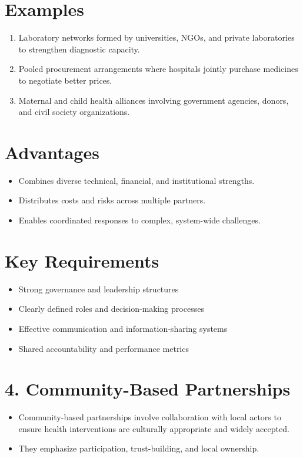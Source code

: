 \documentclass[10pt]{article}
\begin{document}
\section*{Examples}
\begin{enumerate}
  \item Laboratory networks formed by universities, NGOs, and private laboratories to strengthen diagnostic capacity.
  \item Pooled procurement arrangements where hospitals jointly purchase medicines to negotiate better prices.
  \item Maternal and child health alliances involving government agencies, donors, and civil society organizations.
\end{enumerate}

\section*{Advantages}
\begin{itemize}
  \item Combines diverse technical, financial, and institutional strengths.
  \item Distributes costs and risks across multiple partners.
  \item Enables coordinated responses to complex, system-wide challenges.
\end{itemize}

\section*{Key Requirements}
\begin{itemize}
  \item Strong governance and leadership structures
  \item Clearly defined roles and decision-making processes
  \item Effective communication and information-sharing systems
  \item Shared accountability and performance metrics
\end{itemize}

\section*{4. Community-Based Partnerships}
\begin{itemize}
  \item Community-based partnerships involve collaboration with local actors to ensure health interventions are culturally appropriate and widely accepted.
  \item They emphasize participation, trust-building, and local ownership.
\end{itemize}
\end{document}
